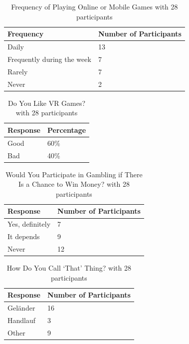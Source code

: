 \documentclass{article}
\begin{document}
\begin{longtable}[]{@{}ll@{}}
\caption{Frequency of Playing Online or Mobile Games with 28 participants} \label{frequency-of-playing-online-or-mobile-games} \\
\toprule\noalign{}
Frequency & Number of Participants \\
\midrule\noalign{}
\endhead
\bottomrule\noalign{}
\endlastfoot
Daily & 13 \\
Frequently during the week & 7 \\
Rarely & 7 \\
Never & 2 \\
\end{longtable}

\begin{longtable}[]{@{}ll@{}}
\caption{Do You Like VR Games? with 28 participants} \label{do-you-like-vr-games} \\
\toprule\noalign{}
Response & Percentage \\
\midrule\noalign{}
\endhead
\bottomrule\noalign{}
\endlastfoot
Good & 60\% \\
Bad & 40\% \\
\end{longtable}

\begin{longtable}[]{@{}ll@{}}
\caption{Would You Participate in Gambling if There Is a Chance to Win Money? with 28 participants} \label{would-you-participate-in-gambling-if-there-is-a-chance-to-win-money} \\
\toprule\noalign{}
Response & Number of Participants \\
\midrule\noalign{}
\endhead
\bottomrule\noalign{}
\endlastfoot
Yes, definitely & 7 \\
It depends & 9 \\
Never & 12 \\
\end{longtable}

\begin{longtable}[]{@{}ll@{}}
\caption{How Do You Call `That' Thing? with 28 participants} \label{how-do-you-call-that-thing} \\
\toprule\noalign{}
Response & Number of Participants \\
\midrule\noalign{}
\endhead
\bottomrule\noalign{}
\endlastfoot
Geländer & 16 \\
Handlauf & 3 \\
Other & 9 \\
\end{longtable}
\end{document}
